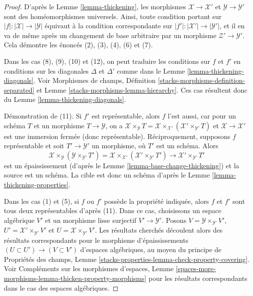 \begin{proof}
D'après le Lemme \ref{lemma-thickening}, les morphismes $\mathcal{X} \to \mathcal{X}'$
et $\mathcal{Y} \to \mathcal{Y}'$ sont des homéomorphismes universels. Ainsi, toute
condition portant sur $|f| : |\mathcal{X}| \to |\mathcal{Y}|$ équivaut à
la condition correspondante sur $|f'| : |\mathcal{X}'| \to |\mathcal{Y}'|$,
et il en va de même après un changement de base arbitraire par un morphisme
$\mathcal{Z}' \to \mathcal{Y}'$. Cela démontre les
énoncés (2), (3), (4), (6) et (7).

\medskip\noindent
Dans les cas (8), (9), (10) et (12), on peut traduire les conditions sur
$f$ et $f'$ en conditions sur les diagonales $\Delta$ et $\Delta'$
comme dans le Lemme \ref{lemma-thickening-diagonals}. Voir
Morphismes de champs, Définition \ref{stacks-morphisms-definition-separated} et
Lemme \ref{stacks-morphisms-lemma-hierarchy}.
Ces cas résultent donc du Lemme \ref{lemma-thickening-diagonals}.

\medskip\noindent
Démonstration de (11). Si $f'$ est représentable, alors $f$ l'est aussi, car
pour un schéma $T$ et un morphisme $T \to \mathcal{Y}$, on a
$\mathcal{X} \times_\mathcal{Y} T =
\mathcal{X} \times_{\mathcal{X}'} (\mathcal{X}' \times_{\mathcal{Y}'} T)$
et $\mathcal{X} \to \mathcal{X}'$ est une immersion fermée (donc représentable).
Réciproquement, supposons $f$ représentable et soit $T' \to \mathcal{Y}'$
un morphisme, où $T'$ est un schéma. Alors
$$
\mathcal{X} \times_{\mathcal{Y}}
(\mathcal{Y} \times_{\mathcal{Y}'} T') =
\mathcal{X} \times_{\mathcal{X}'}
(\mathcal{X}' \times_{\mathcal{Y}'} T') \to
\mathcal{X}' \times_{\mathcal{Y}'} T'
$$
est un épaississement (d'après le Lemme \ref{lemma-base-change-thickening})
et la source est un schéma. La cible est donc un schéma d'après le
Lemme \ref{lemma-thickening-properties}.

\medskip\noindent
Dans les cas (1) et (5), si $f$ ou $f'$ possède la propriété indiquée,
alors $f$ et $f'$ sont tous deux représentables d'après (11). Dans ce cas,
choisissons un espace algébrique $V'$ et un morphisme lisse surjectif
$V' \to \mathcal{Y}'$. Posons $V = \mathcal{Y} \times_{\mathcal{Y}'} V'$,
$U' = \mathcal{X}' \times_{\mathcal{Y}'} V'$ et
$U = \mathcal{X} \times_{\mathcal{Y}'} V'$. Les résultats cherchés
découlent alors des résultats correspondants pour
le morphisme d'épaississements $(U \subset U') \to (V \subset V')$
d'espaces algébriques, au moyen du principe de Propriétés des champs, Lemme
\ref{stacks-properties-lemma-check-property-covering}.
Voir Compléments sur les morphismes d'espaces, Lemme
\ref{spaces-more-morphisms-lemma-thicken-property-morphisms}
pour les résultats correspondants dans le cas des espaces algébriques.
\end{proof}





